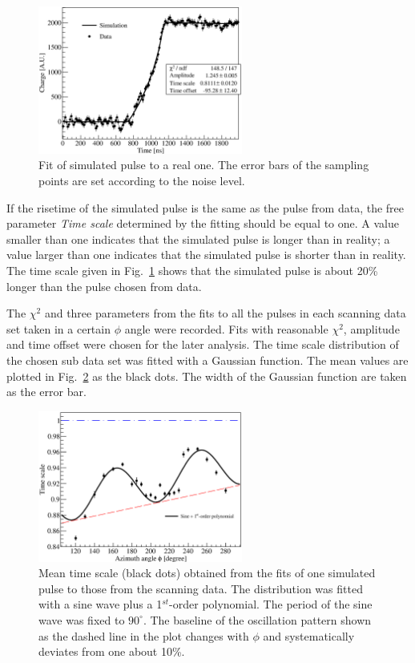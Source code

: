 \begin{figure}[htbp]
\centering
\includegraphics[width=0.6\textwidth]{PSs2d}
\caption{Fit of simulated pulse to a real one. The error bars of the sampling points are set according to the noise level.}
\label{fig:psa:s2d}
\end{figure}

If the risetime of the simulated pulse is the same as the pulse from data, the free parameter \emph{Time scale} determined by the fitting should be equal to one. A value smaller than one indicates that the simulated pulse is longer than in reality; a value larger than one indicates that the simulated pulse is shorter than in reality. The time scale given in Fig.~\ref{fig:psa:s2d} shows that the simulated pulse is about 20\% longer than the pulse chosen from data.

The $\chi^{2}$ and three parameters from the fits to all the pulses in each scanning data set taken in a certain $\phi$ angle were recorded. Fits with reasonable $\chi^{2}$, amplitude and time offset were chosen for the later analysis. The time scale distribution of the chosen sub data set was fitted with a Gaussian function. The mean values are plotted in Fig.~\ref{fig:psa:tsc} as the black dots. The width of the Gaussian function are taken as the error bar.

\begin{figure}[htbp]
\centering
\includegraphics[width=0.6\textwidth]{tsc}
\caption{Mean time scale (black dots) obtained from the fits of one simulated pulse to those from the scanning data. The distribution was fitted with a sine wave plus a 1$^{st}$-order polynomial. The period of the sine wave was fixed to $90^{\circ}$. The baseline of the oscillation pattern shown as the dashed line in the plot changes with $\phi$ and systematically deviates from one about 10\%.}
\label{fig:psa:tsc}
\end{figure}

